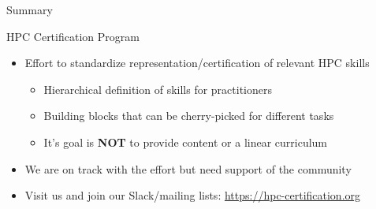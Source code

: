 \documentclass[compress,aspectratio=169]{beamer}
\begin{document}
\begin{frame}{Summary}

	\begin{block}{HPC Certification Program}
		\begin{itemize}
			\item Effort to standardize representation/certification of relevant HPC skills
      \begin{itemize}
        \item Hierarchical definition of skills for practitioners
        \item Building blocks that can be cherry-picked for different tasks
				\item It's goal is \textbf{NOT} to provide content or a linear curriculum
      \end{itemize}
      \item We are on track with the effort but need support of the community
      \item Visit us and join our Slack/mailing lists: \url{https://hpc-certification.org}
		\end{itemize}
	\end{block}
\end{frame}
\end{document}
